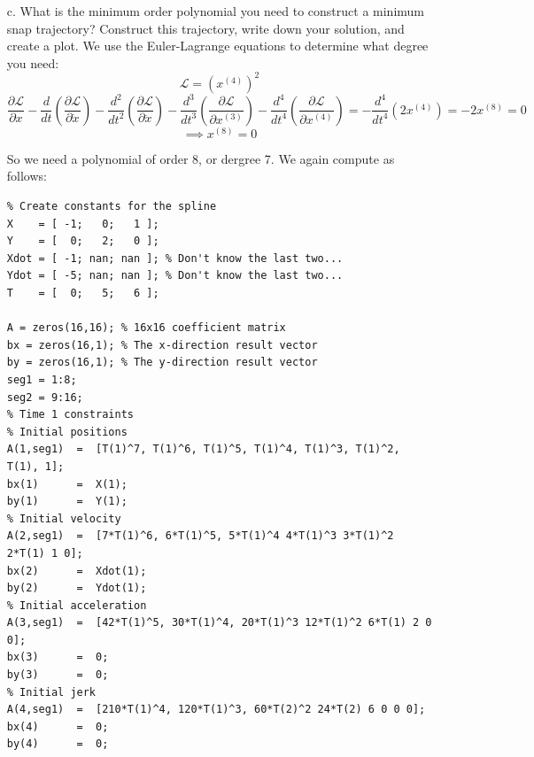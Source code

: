\documentclass[english]{article}
\begin{document}
\begin{enumerate}
\item[c.] What is the minimum order polynomial you need to construct a minimum snap trajectory? Construct this trajectory, write down your solution, and create a plot. 
We use the Euler-Lagrange equations to determine what degree you need:
\[ \mathcal{L} = (x^{(4)})^2 \]
\[ \frac{\partial \mathcal{L}}{\partial x} - \frac{d}{dt} \left( \frac{\partial \mathcal{L}}{\partial \dot{x}} \right)
  - \frac{d^2}{dt^2} \left( \frac{\partial \mathcal{L}}{\partial \ddot{x}} \right)
  - \frac{d^3}{dt^3} \left( \frac{\partial \mathcal{L}}{\partial x^{(3)}} \right)
  - \frac{d^4}{dt^4} \left( \frac{\partial \mathcal{L}}{\partial x^{(4)}} \right)
  =  - \frac{d^4}{dt^4} \left( 2 x^{(4)} \right) = -2 x^{(8)} = 0\]
  \[ \implies x^{(8)} = 0 \]
  
  So we need a polynomial of order 8, or dergree 7. We again compute as follows:

\begin{lstlisting}
% Create constants for the spline
X    = [ -1;   0;   1 ];
Y    = [  0;   2;   0 ];
Xdot = [ -1; nan; nan ]; % Don't know the last two...
Ydot = [ -5; nan; nan ]; % Don't know the last two...
T    = [  0;   5;   6 ];

A = zeros(16,16); % 16x16 coefficient matrix
bx = zeros(16,1); % The x-direction result vector
by = zeros(16,1); % The y-direction result vector
seg1 = 1:8;
seg2 = 9:16;
% Time 1 constraints
% Initial positions
A(1,seg1)  =  [T(1)^7, T(1)^6, T(1)^5, T(1)^4, T(1)^3, T(1)^2, T(1), 1];
bx(1)      =  X(1);
by(1)      =  Y(1);
% Initial velocity
A(2,seg1)  =  [7*T(1)^6, 6*T(1)^5, 5*T(1)^4 4*T(1)^3 3*T(1)^2 2*T(1) 1 0];
bx(2)      =  Xdot(1);
by(2)      =  Ydot(1);
% Initial acceleration
A(3,seg1)  =  [42*T(1)^5, 30*T(1)^4, 20*T(1)^3 12*T(1)^2 6*T(1) 2 0 0];
bx(3)      =  0;
by(3)      =  0;
% Initial jerk
A(4,seg1)  =  [210*T(1)^4, 120*T(1)^3, 60*T(2)^2 24*T(2) 6 0 0 0];
bx(4)      =  0;
by(4)      =  0;


\end{lstlisting}
\end{enumerate}
\end{document}
